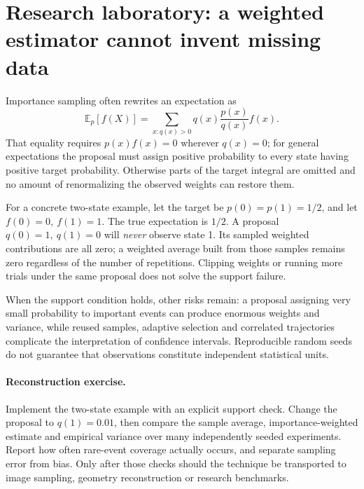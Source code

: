 \clearpage
\section*{Research laboratory: a weighted estimator cannot invent missing data}
\noindent Importance sampling often rewrites an expectation as
\[
\mathbb E_p[f(X)]
=\sum_{x:q(x)>0}q(x)\frac{p(x)}{q(x)}f(x).
\]
That equality requires \(p(x)f(x)=0\) wherever \(q(x)=0\);
for general expectations the proposal must assign positive
probability to every state having positive target probability.
Otherwise parts of the target integral are omitted and no
amount of renormalizing the observed weights can restore them.

For a concrete two-state example, let the target be
\(p(0)=p(1)=1/2\), and let \(f(0)=0,\ f(1)=1\).
The true expectation is \(1/2\).
A proposal \(q(0)=1,\ q(1)=0\) will \emph{never}
observe state 1. Its sampled weighted contributions are all zero;
a weighted average built from those samples remains zero
regardless of the number of repetitions.
Clipping weights or running more trials under the same proposal
does not solve the support failure.

When the support condition holds, other risks remain:
a proposal assigning very small probability to important events
can produce enormous weights and variance, while reused samples,
adaptive selection and correlated trajectories complicate the
interpretation of confidence intervals. Reproducible random seeds
do not guarantee that observations constitute independent
statistical units.

\paragraph{Reconstruction exercise.}
Implement the two-state example with an explicit support check.
Change the proposal to \(q(1)=0.01\), then compare the sample
average, importance-weighted estimate and empirical variance over
many independently seeded experiments. Report how often rare-event
coverage actually occurs, and separate sampling error from bias.
Only after those checks should the technique be transported to
image sampling, geometry reconstruction or research benchmarks.
